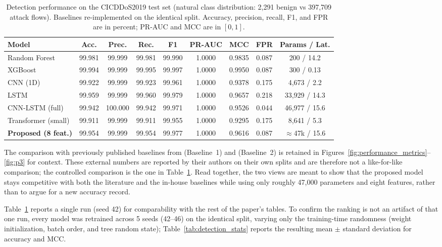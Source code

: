 \documentclass[ASNA,twocolumn]{USG} %
\begin{document}
\begin{table}[hbt!]
\centering
\caption{Detection performance on the CICDDoS2019 test set (natural class distribution: 2{,}291 benign vs 397{,}709 attack flows). Baselines re-implemented on the identical split. Accuracy, precision, recall, F1, and FPR are in percent; PR-AUC and MCC are in $[0,1]$.}
\label{tab:detection_results}
\renewcommand{\arraystretch}{1.2}
\begin{tabular}{|p{3.2cm}|c|c|c|c|c|c|c|c|}
\hline
\textbf{Model} & \textbf{Acc.} & \textbf{Prec.} & \textbf{Rec.} & \textbf{F1} & \textbf{PR-AUC} & \textbf{MCC} & \textbf{FPR} & \textbf{Params / Lat.} \\
\hline
Random Forest & 99.981 & 99.999 & 99.981 & 99.990 & 1.0000 & 0.9835 & 0.087 & 200 / 14.2 \\ \hline
XGBoost & 99.994 & 99.999 & 99.995 & 99.997 & 1.0000 & 0.9950 & 0.087 & 300 / 0.13 \\ \hline
CNN (1D) & 99.922 & 99.999 & 99.923 & 99.961 & 1.0000 & 0.9378 & 0.175 & 4{,}673 / 2.2 \\ \hline
LSTM & 99.959 & 99.999 & 99.960 & 99.979 & 1.0000 & 0.9657 & 0.218 & 33{,}929 / 14.3 \\ \hline
CNN-LSTM (full) & 99.942 & 100.000 & 99.942 & 99.971 & 1.0000 & 0.9526 & 0.044 & 46{,}977 / 15.6 \\ \hline
Transformer (small) & 99.911 & 99.999 & 99.911 & 99.955 & 1.0000 & 0.9295 & 0.175 & 8{,}641 / 5.3 \\ \hline
\rowcolor{gray!20}
\textbf{Proposed (8 feat.)} & 99.954 & 99.999 & 99.954 & 99.977 & 1.0000 & 0.9616 & 0.087 & $\approx$47k / 15.6 \\ \hline
\end{tabular}
\end{table}

The comparison with previously published baselines from \cite{narmadha2024detection} (Baseline~1) and \cite{saluja2024exploring} (Baseline~2) is retained in Figures~\ref{fig:performance_metrics}--\ref{fig:p3} for context. These external numbers are reported by their authors on their own splits and are therefore not a like-for-like comparison; the controlled comparison is the one in Table~\ref{tab:detection_results}. Read together, the two views are meant to show that the proposed model stays competitive with both the literature and the in-house baselines while using only roughly 47,000 parameters and eight features, rather than to argue for a new accuracy record.

Table~\ref{tab:detection_results} reports a single run (seed 42) for comparability with the rest of the paper's tables. To confirm the ranking is not an artifact of that one run, every model was retrained across 5 seeds (42--46) on the identical split, varying only the training-time randomness (weight initialization, batch order, and tree random state); Table~\ref{tab:detection_stats} reports the resulting mean $\pm$ standard deviation for accuracy and MCC.
\end{document}

